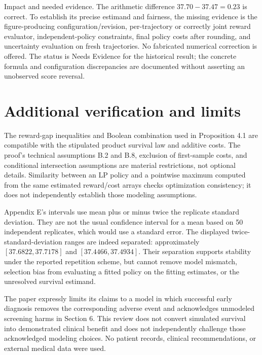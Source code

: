 \documentclass[10pt]{article}
\begin{document}
Impact and needed evidence. The arithmetic difference \(37.70-37.47=0.23\) is correct. To establish its precise estimand and fairness, the missing evidence is the figure-producing configuration/revision, per-trajectory or correctly joint reward evaluator, independent-policy constraints, final policy costs after rounding, and uncertainty evaluation on fresh trajectories. No fabricated numerical correction is offered. The status is Needs Evidence for the historical result; the concrete formula and configuration discrepancies are documented without asserting an unobserved score reversal.\par
\section*{Additional verification and limits}
The reward-gap inequalities and Boolean combination used in Proposition 4.1 are compatible with the stipulated product survival law and additive costs. The proof’s technical assumptions B.2 and B.8, exclusion of first-sample costs, and conditional intersection assumptions are material restrictions, not optional details. Similarity between an LP policy and a pointwise maximum computed from the same estimated reward/cost arrays checks optimization consistency; it does not independently establish those modeling assumptions.\par
Appendix E’s intervals use mean plus or minus twice the replicate standard deviation. They are not the usual confidence interval for a mean based on 50 independent replicates, which would use a standard error. The displayed twice-standard-deviation ranges are indeed separated: approximately \([37.6822,37.7178]\) and \([37.4466,37.4934]\). Their separation supports stability under the reported repetition scheme, but cannot remove model mismatch, selection bias from evaluating a fitted policy on the fitting estimates, or the unresolved survival estimand.\par
The paper expressly limits its claims to a model in which successful early diagnosis removes the corresponding adverse event and acknowledges unmodeled screening harms in Section 6. This review does not convert simulated survival into demonstrated clinical benefit and does not independently challenge those acknowledged modeling choices. No patient records, clinical recommendations, or external medical data were used.\par
\end{document}
